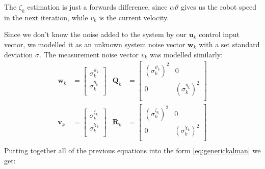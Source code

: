 \documentclass[class=article, crop=false]{standalone}
\begin{document}
The $\zeta_k$ estimation is just a forwards difference, since $\alpha \vartheta$ gives us the robot speed in the next iteration, while $v_k$ is the current velocity.

Since we don't know the noise added to the system by our $\textbf{u}_k$ control input vector, we modelled it as an unknown system noise vector $\textbf{w}_k$ with a set standard deviation $\sigma$. The measurement noise vector $v_k$ was modelled similarly:
\begin{align*}
 \textbf{w}_k & = \begin{bmatrix}
  \sigma^{\vartheta_k}_k \\
  \sigma^{\eta_k}_k      \\
 \end{bmatrix} & \textbf{Q}_k & = \begin{bmatrix}
  (\sigma^{\vartheta_k}_k)^2 & 0                     \\
  0                          & (\sigma^{\eta_k}_k)^2 \\
 \end{bmatrix} \\
 \textbf{v}_k & = \begin{bmatrix}
  \sigma^{\zeta_k}_k \\
  \sigma^{\chi_k}_k  \\
 \end{bmatrix} & \textbf{R}_k & = \begin{bmatrix}
  (\sigma^{\zeta_k}_k)^2 & 0                     \\
  0                      & (\sigma^{\chi_k}_k)^2 \\
 \end{bmatrix} \\
\end{align*}\label{eq:noisemodel}
Putting together all of the previous equations into the form \eqref{eq:generickalman} we get:
\end{document}
